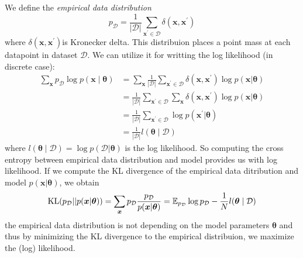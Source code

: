 We define the \textit{empirical data distribution}
$$
p_{\mathcal{D}} = \frac{1}{|\mathcal{D}|} \sum_{\boldsymbol{x}^\prime \in \mathcal{D}} \delta(\boldsymbol{x},\boldsymbol{x}^\prime)
$$
where $\delta(\boldsymbol{x},\boldsymbol{x}^\prime)$is Kronecker delta.  This distribuion places a point mass at each datapoint in dataset $\mathcal{D}$.
We can utilize it for writting the log likelihood (in discrete case):
\begin{align*}
\sum_{\boldsymbol{x}} p_{\mathcal{D}} \log p(\boldsymbol{x} \mid \boldsymbol{\theta}) &= \sum_{\boldsymbol{x}} \frac{1}{|\mathcal{D}|} \sum_{\boldsymbol{x}^\prime \in \mathcal{D}} \delta(\boldsymbol{x},\boldsymbol{x}^\prime) \log  p(\boldsymbol{x} | \boldsymbol{\theta}) \\
    &= \frac{1}{|\mathcal{D}|} \sum_{\boldsymbol{x}^\prime \in \mathcal{D}} \sum_{\boldsymbol{x}} \delta(\boldsymbol{x},\boldsymbol{x}^\prime) \log  p(\boldsymbol{x} | \boldsymbol{\theta})\\
    &= \frac{1}{|\mathcal{D}|} \sum_{\boldsymbol{x}^\prime \in \mathcal{D}} \log  p(\boldsymbol{x}^\prime | \boldsymbol{\theta}) \\
    &= \frac{1}{|\mathcal{D}|} l(\boldsymbol{\theta} \mid \mathcal{D})
\end{align*}
where $l(\boldsymbol{\theta} \mid \mathcal{D}) = \log p(\mathcal{D} | \boldsymbol{\theta})$ is the log likelihood. So computing the cross entropy between empirical data distribution and model provides us with log likelihood.
If we compute the KL divergence of the empirical data ditribution and model $p(\boldsymbol{x} | \boldsymbol{\theta})$, we obtain
$$
\mathrm{KL}(p_{\mathcal{D}} || p(\boldsymbol{x} | \boldsymbol{\theta})) = \sum_{\boldsymbol{x}} p_{\mathcal{D}} \frac{p_{\mathcal{D}}}{p(\boldsymbol{x} | \boldsymbol{\theta})} = \operatorname{\mathbb{E}}_{p_{\mathcal{D}}} \log p_{\mathcal{D}} - \frac{1}{N} l(\boldsymbol{\theta} \mid \mathcal{D})
$$ 
the empirical data distribution is not depending on the model parameters $\boldsymbol{\theta}$ and thus by minimizing the KL divergence to the empirical distribuion, we maximize the (log) likelihood. 
